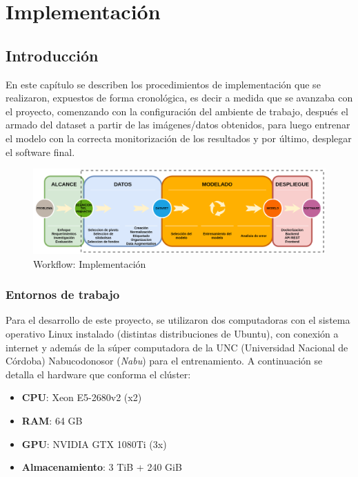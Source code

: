 \chapter{Implementación}
\label{Implementación}

\section{Introducción}
En este capítulo se describen los procedimientos de implementación que se realizaron, expuestos de forma cronológica, es decir a medida que se avanzaba con el proyecto, comenzando con la configuración del ambiente de trabajo, después el armado del dataset a partir de las imágenes/datos obtenidos, para luego entrenar el modelo con la correcta monitorización de los resultados y por último, desplegar el software final.

\begin{figure}
    \centering
    \includegraphics[width=1.2\textwidth,center]{img/Wokflow - datos_modelado_despliegue.drawio.png}
    \caption{Workflow: Implementación}
    \label{fig:workflow - implementacion}
\end{figure}

\subsection{Entornos de trabajo} %
Para el desarrollo de este proyecto, se utilizaron dos computadoras con el sistema operativo Linux instalado (distintas distribuciones de Ubuntu), con conexión a internet y además de la súper computadora de la UNC (Universidad Nacional de Córdoba) Nabucodonosor (\textit{Nabu}) \cite{nabucodonosor} para el entrenamiento. A continuación se detalla el hardware que conforma el clúster:
\begin{itemize}
    \item \textbf{CPU}: Xeon E5-2680v2 (x2)
    \item \textbf{RAM}: 64 GB
    \item \textbf{GPU}: NVIDIA GTX 1080Ti (3x)
    \item \textbf{Almacenamiento}: 3 TiB + 240 GiB
\end{itemize}


